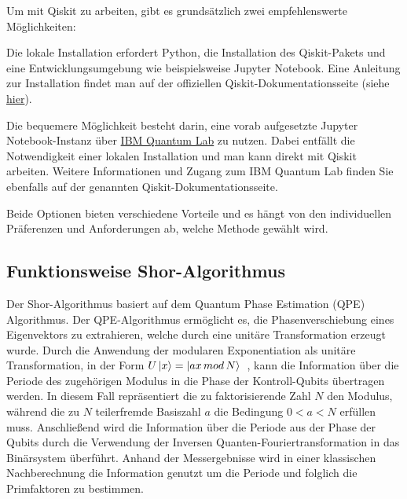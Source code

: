 \documentclass[
  a4paper, %
  10pt, %
  unnumberedsections, %
  twoside, %
]{LTJournalArticle}
\begin{document}
Um mit Qiskit zu arbeiten, gibt es grundsätzlich zwei empfehlenswerte Möglichkeiten:
\begin{description}[style=nextline]
\item[Lokale Installation]
Die lokale Installation erfordert Python,
die Installation des Qiskit-Pakets und eine Entwicklungsumgebung wie beispielsweise Jupyter Notebook.
Eine Anleitung zur Installation findet man auf der offiziellen Qiskit-Dokumentationsseite
(siehe \href{https://qiskit.org/documentation/stable/0.24/install.html}{hier}).
\item[IBM Quantum Lab]
Die bequemere Möglichkeit besteht darin,
eine vorab aufgesetzte Jupyter Notebook-Instanz über
\href{https://qiskit.org/documentation/stable/0.24/install.html}{IBM Quantum Lab}
zu nutzen.
Dabei entfällt die Notwendigkeit einer lokalen Installation und man kann direkt mit Qiskit arbeiten.
Weitere Informationen und Zugang zum IBM Quantum Lab finden Sie ebenfalls auf der genannten Qiskit-Dokumentationsseite.
\end{description}
Beide Optionen bieten verschiedene Vorteile und es hängt von den individuellen Präferenzen und Anforderungen ab,
welche Methode gewählt wird.

\subsection{\Large Funktionsweise Shor-Algorithmus}

Der Shor-Algorithmus basiert auf dem Quantum Phase Estimation (QPE) Algorithmus.
Der QPE-Algorithmus ermöglicht es, die Phasenverschiebung eines Eigenvektors zu extrahieren,
welche durch eine unitäre Transformation erzeugt wurde.
Durch die Anwendung der modularen Exponentiation als unitäre Transformation,
in der Form \(U\ket{x} = \ket{ax\,mod\,N}\)~\autocite{IBM:Shor},
kann die Information über die Periode des zugehörigen Modulus in die Phase der Kontroll-Qubits übertragen werden.
In diesem Fall repräsentiert die zu faktorisierende Zahl \(N\) den Modulus,
während die zu \(N\) teilerfremde Basiszahl \(a\) die Bedingung \(0 < a < N\) erfüllen muss.
Anschließend wird die Information über die Periode aus der Phase der Qubits
durch die Verwendung der Inversen Quanten-Fouriertransformation in das Binärsystem überführt.
Anhand der Messergebnisse wird in einer klassischen Nachberechnung die Information genutzt
um die Periode und folglich die Primfaktoren zu bestimmen.
\end{document}
